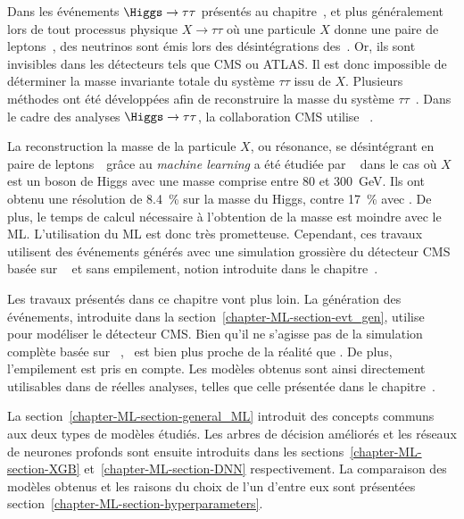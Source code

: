 \par
Dans les événements $\Higgs\to\tau\tau$ présentés au chapitre~,
et plus généralement lors de tout processus physique $X\to\tau\tau$ où une particule $X$ donne une paire de leptons~\tau,
des neutrinos sont émis lors des désintégrations des~\tau.
Or, ils sont invisibles dans les détecteurs tels que CMS ou ATLAS.
Il est donc impossible de déterminer la masse invariante totale du système $\tau\tau$ issu de $X$.
Plusieurs méthodes ont été développées afin de reconstruire la masse du système $\tau\tau$~\cite{ELAGIN2011481,Barr_2011,Gripaios_2013}.
Dans le cadre des analyses $\Higgs\to\tau\tau$, la collaboration CMS utilise \SVFIT~\cite{SVFit_Bianchini_2014}.
\par
La reconstruction la masse de la particule $X$, ou résonance, se désintégrant en paire de leptons~\tau\ grâce au \emph{machine learning}
a été étudiée par \citeauthor{BARTSCHI201929}~\cite{BARTSCHI201929} dans le cas où $X$ est un boson de Higgs avec une masse comprise entre \num{80} et \SI{300}{\GeV}.
Ils ont obtenu une résolution de \SI{8.4}{\%} sur la masse du Higgs, contre \SI{17}{\%} avec \SVFIT.
De plus, le temps de calcul nécessaire à l'obtention de la masse est moindre avec le ML.
L'utilisation du ML est donc très prometteuse.
Cependant,
ces travaux utilisent des événements générés
avec une simulation grossière du détecteur CMS basée sur
\DELPHES~\cite{Delphes,Delphes_additions}
et sans empilement, notion introduite dans le chapitre~.
\par
Les travaux présentés dans ce chapitre vont plus loin.
La génération des événements, introduite dans la section~\ref{chapter-ML-section-evt_gen},
utilise \FASTSIM~\cite{FastSim_2011,FastSim_2014,FastSim_2017_1,FastSim_2017_2}
pour modéliser le détecteur CMS.
Bien qu'il ne s'agisse pas de la simulation complète basée sur \GEANTfour~\cite{geant4_2003,geant4_2006,geant4_2016},
\FASTSIM\ est bien plus proche de la réalité que \DELPHES.
De plus, l'empilement est pris en compte.
Les modèles obtenus sont ainsi directement utilisables dans de réelles analyses, telles que celle présentée dans le chapitre~.
\par
La section~\ref{chapter-ML-section-general_ML} introduit des concepts communs aux deux types de modèles étudiés.
Les arbres de décision améliorés et les réseaux de neurones profonds sont ensuite introduits dans les sections~\ref{chapter-ML-section-XGB} et~\ref{chapter-ML-section-DNN} respectivement.
La comparaison des modèles obtenus et les raisons du choix de l'un d'entre eux sont présentées section~\ref{chapter-ML-section-hyperparameters}.
